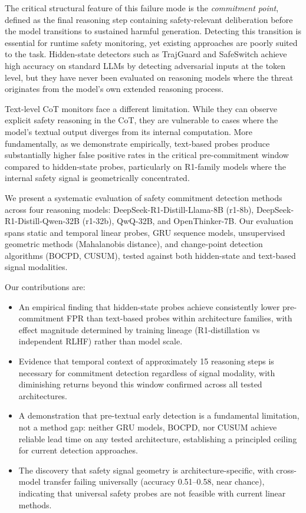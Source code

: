\documentclass[11pt,a4paper]{article}
\begin{document}
The critical structural feature of this failure mode is the \emph{commitment point}, defined as the final reasoning step containing safety-relevant deliberation before the model transitions to sustained harmful generation. Detecting this transition is essential for runtime safety monitoring, yet existing approaches are poorly suited to the task. Hidden-state detectors such as TrajGuard and SafeSwitch achieve high accuracy on standard LLMs by detecting adversarial inputs at the token level, but they have never been evaluated on reasoning models where the threat originates from the model's own extended reasoning process.

Text-level CoT monitors face a different limitation. While they can observe explicit safety reasoning in the CoT, they are vulnerable to cases where the model's textual output diverges from its internal computation. More fundamentally, as we demonstrate empirically, text-based probes produce substantially higher false positive rates in the critical pre-commitment window compared to hidden-state probes, particularly on R1-family models where the internal safety signal is geometrically concentrated.

We present a systematic evaluation of safety commitment detection methods across four reasoning models: DeepSeek-R1-Distill-Llama-8B (r1-8b), DeepSeek-R1-Distill-Qwen-32B (r1-32b), QwQ-32B, and OpenThinker-7B. Our evaluation spans static and temporal linear probes, GRU sequence models, unsupervised geometric methods (Mahalanobis distance), and change-point detection algorithms (BOCPD, CUSUM), tested against both hidden-state and text-based signal modalities.

Our contributions are:
\begin{itemize}
\item An empirical finding that hidden-state probes achieve consistently lower pre-commitment FPR than text-based probes within architecture families, with effect magnitude determined by training lineage (R1-distillation vs independent RLHF) rather than model scale.
\item Evidence that temporal context of approximately 15 reasoning steps is necessary for commitment detection regardless of signal modality, with diminishing returns beyond this window confirmed across all tested architectures.
\item A demonstration that pre-textual early detection is a fundamental limitation, not a method gap: neither GRU models, BOCPD, nor CUSUM achieve reliable lead time on any tested architecture, establishing a principled ceiling for current detection approaches.
\item The discovery that safety signal geometry is architecture-specific, with cross-model transfer failing universally (accuracy 0.51--0.58, near chance), indicating that universal safety probes are not feasible with current linear methods.
\end{itemize}
\end{document}
